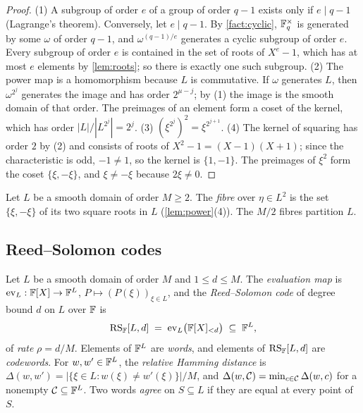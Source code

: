 \begin{proof}
(1) A subgroup of order $e$ of a group of order $q-1$ exists only if $e \mid q-1$ (Lagrange's theorem).
Conversely, let $e \mid q-1$. By \cref{fact:cyclic}, $\mathbb{F}_q^\times$ is generated by some $\omega$ of order $q-1$, and $\omega^{(q-1)/e}$ generates a cyclic subgroup of order $e$.
Every subgroup of order $e$ is contained in the set of roots of $X^e - 1$, which has at most $e$ elements by \cref{lem:roots}; so there is exactly one such subgroup.
(2) The power map is a homomorphism because $L$ is commutative. If $\omega$ generates $L$, then $\omega^{2^j}$ generates the image and has order $2^{\mu-j}$; by (1) the image is the smooth domain of that order. The preimages of an element form a coset of the kernel, which has order $|L|/|L^{2^j}| = 2^j$.
(3) $(\xi^{2^j})^2 = \xi^{2^{j+1}}$.
(4) The kernel of squaring has order $2$ by (2) and consists of roots of $X^2 - 1 = (X-1)(X+1)$; since the characteristic is odd, $-1 \ne 1$, so the kernel is $\{1,-1\}$. The preimages of $\xi^2$ form the coset $\{\xi, -\xi\}$, and $\xi \ne -\xi$ because $2\xi \ne 0$.
\end{proof}

\begin{definition}\label{def:fibre}
Let $L$ be a smooth domain of order $M \ge 2$. The \emph{fibre} over $\eta \in L^2$ is the set $\{\xi, -\xi\}$ of its two square roots in $L$ (\cref{lem:power}(4)).
The $M/2$ fibres partition $L$.
\end{definition}

\subsection{Reed--Solomon codes}\label{sec:prelim:rs}

\begin{definition}\label{def:rs}
Let $L$ be a smooth domain of order $M$ and $1 \le d \le M$.
The \emph{evaluation map} is $\mathrm{ev}_L : \mathbb{F}[X] \to \mathbb{F}^{L}$, $P \mapsto (P(\xi))_{\xi \in L}$, and the \emph{Reed--Solomon code} of degree bound $d$ on $L$ over $\mathbb{F}$ is
\[
  \mathrm{RS}_{\mathbb{F}}[L,d] \;=\; \mathrm{ev}_L\bigl(\mathbb{F}[X]_{<d}\bigr) \;\subseteq\; \mathbb{F}^{L},
\]
of \emph{rate} $\rho = d/M$.
Elements of $\mathbb{F}^L$ are \emph{words}, and elements of $\mathrm{RS}_{\mathbb{F}}[L,d]$ are \emph{codewords}.
For $w, w' \in \mathbb{F}^L$, the \emph{relative Hamming distance} is $\Delta(w,w') = |\{\xi \in L : w(\xi) \ne w'(\xi)\}|/M$, and $\Delta(w, \mathcal{C}) = \min_{c \in \mathcal{C}} \Delta(w,c)$ for a nonempty $\mathcal{C} \subseteq \mathbb{F}^L$.
Two words \emph{agree} on $S \subseteq L$ if they are equal at every point of $S$.
\end{definition}

